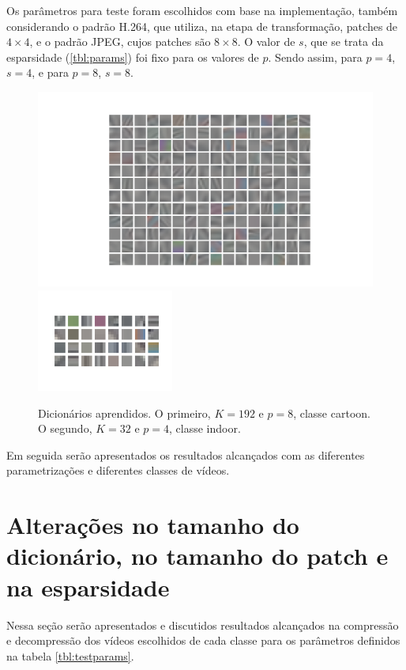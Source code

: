 \documentclass[cic,tc]{iiufrgs}
\begin{document}
Os parâmetros para teste foram escolhidos com base na implementação, também considerando 
o padrão H.264, que utiliza, na etapa de transformação, patches de $4\times4$, 
e o padrão JPEG, cujos patches são $8\times8$.
O valor de $s$, que se trata da esparsidade (\autoref{tbl:params}) foi fixo para os valores de $p$. 
Sendo assim, para $p=4$, $s=4$, e para $p=8$, $s=8$.

\begin{figure}[H]
    \caption{Dicionários aprendidos. O primeiro, $K=192$ e $p=8$, classe cartoon. 
    O segundo, $K=32$ e $p=4$, classe indoor.}
    \begin{center}
        \includegraphics[width=\textwidth]{img/cartoon_p8_d192.png}
        \includegraphics[width=0.4\textwidth]{img/indoor_p4_d32.png}
    \end{center}
\end{figure}

Em seguida serão apresentados os resultados alcançados com as diferentes parametrizações 
e diferentes classes de vídeos.

\section{Alterações no tamanho do dicionário, no tamanho do patch e na esparsidade}
\label{sec:parametrizacao}
Nessa seção serão apresentados e discutidos resultados alcançados na compressão e 
decompressão dos vídeos escolhidos de cada classe para os parâmetros definidos na 
tabela \ref{tbl:testparams}.
\end{document}

